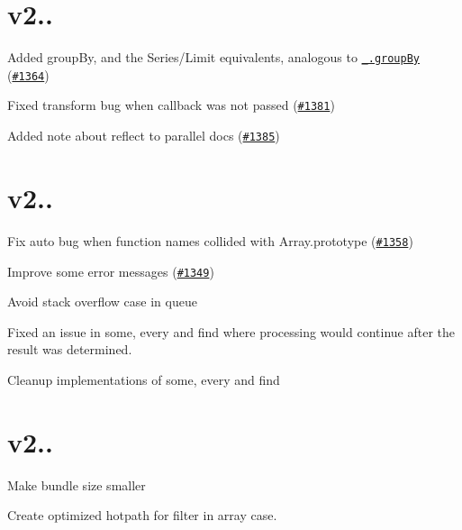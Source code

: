 \section*{v2..}


\begin{DoxyItemize}
\item Added {\ttfamily group\+By}, and the {\ttfamily Series}/{\ttfamily Limit} equivalents, analogous to \href{http://lodash.com/docs#groupBy}{\tt {\ttfamily \+\_\+.\+group\+By}} (\href{https://github.com/caolan/async/issues/1364}{\tt \#1364})
\item Fixed {\ttfamily transform} bug when {\ttfamily callback} was not passed (\href{https://github.com/caolan/async/issues/1381}{\tt \#1381})
\item Added note about {\ttfamily reflect} to {\ttfamily parallel} docs (\href{https://github.com/caolan/async/issues/1385}{\tt \#1385})
\end{DoxyItemize}

\section*{v2..}


\begin{DoxyItemize}
\item Fix {\ttfamily auto} bug when function names collided with Array.\+prototype (\href{https://github.com/caolan/async/issues/1358}{\tt \#1358})
\item Improve some error messages (\href{https://github.com/caolan/async/issues/1349}{\tt \#1349})
\item Avoid stack overflow case in queue
\item Fixed an issue in {\ttfamily some}, {\ttfamily every} and {\ttfamily find} where processing would continue after the result was determined.
\item Cleanup implementations of {\ttfamily some}, {\ttfamily every} and {\ttfamily find}
\end{DoxyItemize}

\section*{v2..}


\begin{DoxyItemize}
\item Make bundle size smaller
\item Create optimized hotpath for {\ttfamily filter} in array case.
\end{DoxyItemize}

